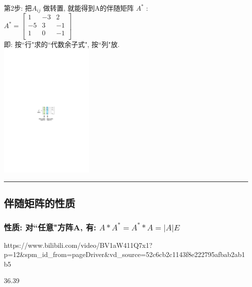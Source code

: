 \documentclass[UTF8]{ctexart}
\begin{document}
第2步: 把$ A_{ij}$ 做转置, 就能得到A的伴随矩阵 $A^*$ :\\
$
A^*=\left[ \begin{array}{c|c|c}
	1&		-3&		2\\
	-5&		3&		-1\\
	1&		0&		-1\\
\end{array} \right]
$\\

即: 按``行"求的``代数余子式", 按``列"放. \\
\includegraphics[width=0.35\textwidth]{img/0025.pdf}\\


\hrule


\subsection{伴随矩阵的性质}

\subsubsection{性质: 对``任意"方阵A, 有: $A * A^{\ast} = A^{\ast} * A = |A|E$}






https://www.bilibili.com/video/BV1aW411Q7x1?p=12&spm_id_from=pageDriver&vd_source=52c6cb2c1143f8e222795afbab2ab1b5

36.39



	
\end{document}
